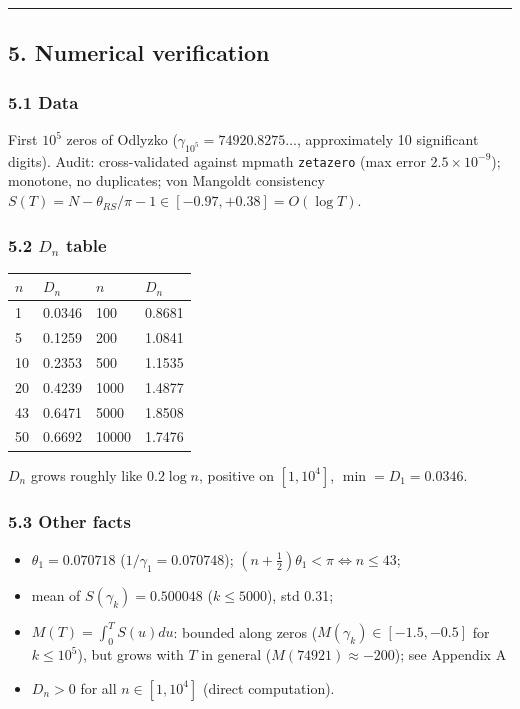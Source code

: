 \documentclass[
]{article}
\providecommand{\tightlist}{%
  \setlength{\itemsep}{0pt}\setlength{\parskip}{0pt}}
\begin{document}
\begin{center}\rule{0.5\linewidth}{0.5pt}\end{center}

\hypertarget{numerical-verification}{%
\subsection{5. Numerical verification}\label{numerical-verification}}

\hypertarget{data}{%
\subsubsection{5.1 Data}\label{data}}

First \(10^5\) zeros of Odlyzko (\(\gamma_{10^5} = 74920.8275\ldots\),
approximately 10 significant digits). Audit: cross-validated against
mpmath \texttt{zetazero} (max error \(2.5\times10^{-9}\)); monotone, no
duplicates; von Mangoldt consistency
\(S(T) = N - \theta_{RS}/\pi - 1 \in [-0.97, +0.38] = O(\log T)\).

\hypertarget{d_n-table}{%
\subsubsection{\texorpdfstring{5.2 \(D_n\)
table}{5.2 D\_n table}}\label{d_n-table}}

\begin{longtable}[]{@{}llll@{}}
\toprule
\(n\) & \(D_n\) & \(n\) & \(D_n\) \\
\midrule
\endhead
1 & 0.0346 & 100 & 0.8681 \\
5 & 0.1259 & 200 & 1.0841 \\
10 & 0.2353 & 500 & 1.1535 \\
20 & 0.4239 & 1000 & 1.4877 \\
43 & 0.6471 & 5000 & 1.8508 \\
50 & 0.6692 & 10000 & 1.7476 \\
\bottomrule
\end{longtable}

\(D_n\) grows roughly like \(0.2\log n\), positive on \([1,10^4]\),
\(\min = D_1 = 0.0346\).

\hypertarget{other-facts}{%
\subsubsection{5.3 Other facts}\label{other-facts}}

\begin{itemize}
\tightlist
\item
  \(\theta_1 = 0.070718\) (\(1/\gamma_1 = 0.070748\));
  \((n+\tfrac12)\theta_1 < \pi \iff n \le 43\);
\item
  mean of \(S(\gamma_k) = 0.500048\) (\(k\le 5000\)), std 0.31;
\item
  \(M(T) = \int_0^T S(u)du\): bounded along zeros
  (\(M(\gamma_k) \in [-1.5, -0.5]\) for \(k \le 10^5\)), but grows with
  \(T\) in general (\(M(74921) \approx -200\)); see Appendix A
\item
  \(D_n > 0\) for all \(n \in [1, 10^4]\) (direct computation).
\end{itemize}
\end{document}
